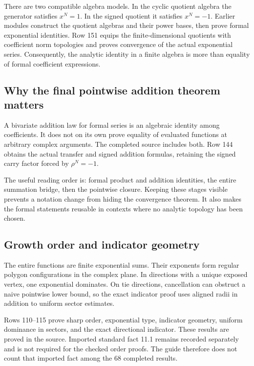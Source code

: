 There are two compatible algebra models. In the cyclic quotient algebra the generator satisfies $x^N=1$. In the signed quotient it satisfies $x^N=-1$. Earlier modules construct the quotient algebras and their power bases, then prove formal exponential identities. Row 151 equips the finite-dimensional quotients with coefficient norm topologies and proves convergence of the actual exponential series. Consequently, the analytic identity in a finite algebra is more than equality of formal coefficient expressions.

\subsection{Why the final pointwise addition theorem matters}
A bivariate addition law for formal series is an algebraic identity among coefficients. It does not on its own prove equality of evaluated functions at arbitrary complex arguments. The completed source includes both. Row 144 obtains the actual transfer and signed addition formulas, retaining the signed carry factor forced by $\rho^N=-1$.

The useful reading order is: formal product and addition identities, the entire summation bridge, then the pointwise closure. Keeping these stages visible prevents a notation change from hiding the convergence theorem. It also makes the formal statements reusable in contexts where no analytic topology has been chosen.

\subsection{Growth order and indicator geometry}
The entire functions are finite exponential sums. Their exponents form regular polygon configurations in the complex plane. In directions with a unique exposed vertex, one exponential dominates. On tie directions, cancellation can obstruct a naive pointwise lower bound, so the exact indicator proof uses aligned radii in addition to uniform sector estimates.

Rows 110--115 prove sharp order, exponential type, indicator geometry, uniform dominance in sectors, and the exact directional indicator. These results are proved in the source. Imported standard fact 11.1 remains recorded separately and is not required for the checked order proofs. The guide therefore does not count that imported fact among the 68 completed results.
